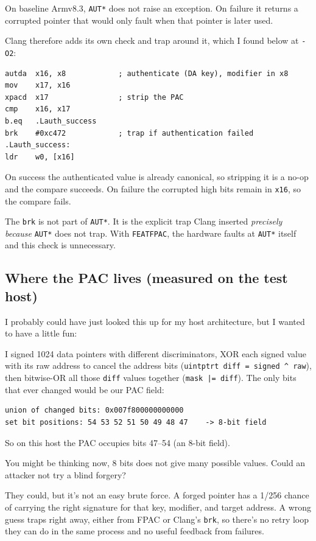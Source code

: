 On baseline Armv8.3, \texttt{AUT*} does not raise an exception. On failure it returns a corrupted pointer that would only fault when that pointer is later used.

Clang therefore adds its own check and trap around it, which I found below at \texttt{-O2}:

\begin{verbatim}
autda  x16, x8            ; authenticate (DA key), modifier in x8
mov    x17, x16
xpacd  x17                ; strip the PAC
cmp    x16, x17
b.eq   .Lauth_success
brk    #0xc472            ; trap if authentication failed
.Lauth_success:
ldr    w0, [x16]
\end{verbatim}

On success the authenticated value is already canonical, so stripping it is a no-op and the compare succeeds. On failure the corrupted high bits remain in \texttt{x16}, so the compare fails.

The \texttt{brk} is not part of \texttt{AUT*}. It is the explicit trap Clang inserted \textit{precisely because} \texttt{AUT*} does not trap. With \texttt{FEAT\uscore{}FPAC}, the hardware faults at \texttt{AUT*} itself and this check is unnecessary.

\subsection{Where the PAC lives (measured on the test host)}

I probably could have just looked this up for my host architecture, but I wanted to have a little fun:

I signed 1024 data pointers with different discriminators, XOR each signed value with its raw address to cancel the address bits (\texttt{uintptr\uscore{}t diff = signed \^{} raw}), then bitwise-OR all those \texttt{diff} values together (\texttt{mask |= diff}). The only bits that ever changed would be our PAC field:

\begin{verbatim}
union of changed bits: 0x007f800000000000
set bit positions: 54 53 52 51 50 49 48 47    -> 8-bit field
\end{verbatim}

So on this host the PAC occupies bits 47--54 (an 8-bit field).

You might be thinking now, 8 bits does not give many possible values. Could an attacker not try a blind forgery?

They could, but it's not an easy brute force. A forged pointer has a 1/256 chance of carrying the right signature for that key, modifier, and target address. A wrong guess traps right away, either from FPAC or Clang's \texttt{brk}, so there's no retry loop they can do in the same process and no useful feedback from failures.


